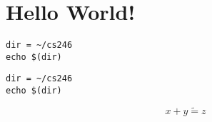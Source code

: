 \documentclass{article}
\begin{document}



\section{Hello World!}

\begin{algex}
\begin{lstlisting}[style=BashStyle]
dir = ~/cs246
echo $(dir)

\end{lstlisting}%
\end{algex}

\begin{ex}
\begin{lstlisting}[style=BashStyle]
dir = ~/cs246
echo $(dir)

\end{lstlisting}%
\end{ex}
$$
x+ y \tilde = z
$$
\end{document}
